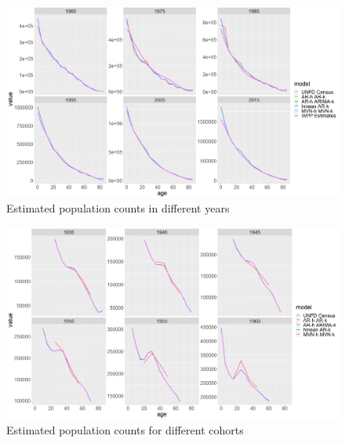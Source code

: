 \documentclass[12pt,a4paper]{article}
\begin{document}
\newpage
\begin{figure}[H]
\includegraphics[width = \linewidth]{Burkina Faso/6/period pop.png} 	
\caption{Estimated population counts in different years}
\end{figure}
\begin{figure}[H]
\includegraphics[width = \linewidth]{Burkina Faso/6/cohort pop.png}
\caption{Estimated population counts for different cohorts}
\end{figure}
\end{document}
